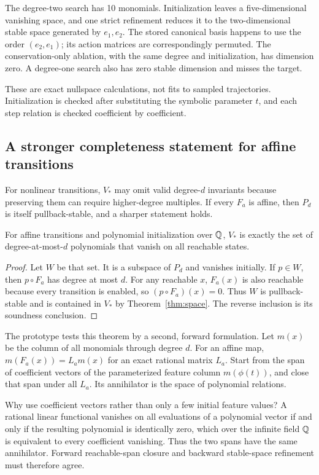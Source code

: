 The degree-two search has 10 monomials. Initialization leaves a five-dimensional
vanishing space, and one strict refinement reduces it to the two-dimensional
stable space generated by $e_1,e_2$. The stored canonical basis happens to use
the order $(e_2,e_1)$; its action matrices are correspondingly permuted. The
conservation-only ablation, with the same degree and initialization, has dimension
zero. A degree-one search also has zero stable dimension and misses the target.

These are exact nullspace calculations, not fits to sampled trajectories.
Initialization is checked after substituting the symbolic parameter $t$, and
each step relation is checked coefficient by coefficient.

\subsection{A stronger completeness statement for affine transitions}

For nonlinear transitions, $V_*$ may omit valid degree-$d$ invariants because
preserving them can require higher-degree multiples. If every $F_a$ is affine,
then $P_d$ is itself pullback-stable, and a sharper statement holds.

\begin{theorem}\label{thm:affine}
For affine transitions and polynomial initialization over $\mathbb{Q}$, $V_*$ is exactly
the set of degree-at-most-$d$ polynomials that vanish on all reachable states.
\end{theorem}
\begin{proof}
Let $W$ be that set. It is a subspace of $P_d$ and vanishes initially.
If $p\in W$, then $p\circ F_a$ has degree at most $d$. For any reachable $x$,
$F_a(x)$ is also reachable because every transition is enabled, so
$(p\circ F_a)(x)=0$. Thus $W$ is pullback-stable and is contained in $V_*$ by
Theorem~\ref{thm:space}. The reverse inclusion is its soundness conclusion.
\end{proof}

The prototype tests this theorem by a second, forward formulation. Let
$m(x)$ be the column of all monomials through degree $d$. For an affine map,
$m(F_a(x))=L_a m(x)$ for an exact rational matrix $L_a$. Start from the span of
coefficient vectors of the parameterized feature column $m(\phi(t))$, and close
that span under all $L_a$. Its annihilator is the space of polynomial relations.

Why use coefficient vectors rather than only a few initial feature values?
A rational linear functional vanishes on all evaluations of a polynomial vector
if and only if the resulting polynomial is identically zero, which over the
infinite field $\mathbb{Q}$ is equivalent to every coefficient vanishing. Thus the two
spans have the same annihilator. Forward reachable-span closure and backward
stable-space refinement must therefore agree.


